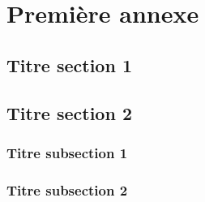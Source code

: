 \chapter{Première annexe}
\label{annexe:one}

\fancyhead[LE]{\textsc{\chaptername~\thechapter}}

\section{Titre section 1}

\lipsum[4] 

\lipsum[5] 

\section{Titre section 2}

\lipsum[6]

\subsection{Titre subsection 1}

\lipsum[7]

\lipsum[8]

\lipsum[13]

\subsection{Titre subsection 2}

\lipsum[9]

\lipsum[10]

\lipsum[12]
